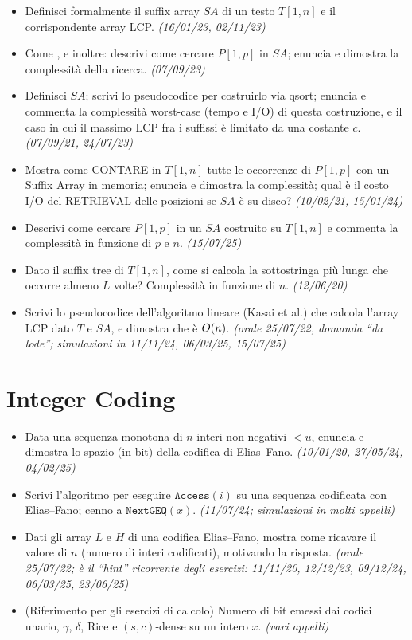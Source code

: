 \begin{itemize}[leftmargin=1.4em]
\item {} Definisci formalmente il suffix array $SA$ di un testo $T[1,n]$ e il corrispondente
array LCP. \emph{(16/01/23, 02/11/23)}
\item {}\hot Come , e inoltre: descrivi come cercare $P[1,p]$ in $SA$; enuncia e dimostra
la complessit\`a della ricerca. \emph{(07/09/23)}
\item {} Definisci $SA$; scrivi lo pseudocodice per costruirlo via qsort; enuncia e commenta
la complessit\`a worst-case (tempo e I/O) di questa costruzione, e il caso in cui il massimo LCP fra
i suffissi \`e limitato da una costante $c$. \emph{(07/09/21, 24/07/23)}
\item {}\hot Mostra come CONTARE in $T[1,n]$ tutte le occorrenze di $P[1,p]$ con un Suffix Array
in memoria; enuncia e dimostra la complessit\`a; qual \`e il costo I/O del RETRIEVAL delle posizioni
se $SA$ \`e su disco? \emph{(10/02/21, 15/01/24)}
\item {}\hot Descrivi come cercare $P[1,p]$ in un $SA$ costruito su $T[1,n]$ e commenta la
complessit\`a in funzione di $p$ e $n$. \emph{(15/07/25)}
\item {} Dato il suffix tree di $T[1,n]$, come si calcola la sottostringa pi\`u lunga che
occorre almeno $L$ volte? Complessit\`a in funzione di $n$. \emph{(12/06/20)}
\item {} Scrivi lo pseudocodice dell'algoritmo lineare (Kasai et al.) che calcola l'array LCP
dato $T$ e $SA$, e dimostra che \`e $O\!\left(n\right)$. \emph{(orale 25/07/22, domanda ``da lode''; simulazioni
in 11/11/24, 06/03/25, 15/07/25)}
\end{itemize}

\section{Integer Coding}

\begin{itemize}[leftmargin=1.4em]
\item {}\hot Data una sequenza monotona di $n$ interi non negativi $<u$, enuncia e dimostra lo
spazio (in bit) della codifica di Elias--Fano. \emph{(10/01/20, 27/05/24, 04/02/25)}
\item {} Scrivi l'algoritmo per eseguire $\texttt{Access}(i)$ su una sequenza codificata con
Elias--Fano; cenno a $\texttt{NextGEQ}(x)$. \emph{(11/07/24; simulazioni in molti appelli)}
\item {} Dati gli array $L$ e $H$ di una codifica Elias--Fano, mostra come ricavare il valore
di $n$ (numero di interi codificati), motivando la risposta. \emph{(orale 25/07/22; \`e il ``hint''
ricorrente degli esercizi: 11/11/20, 12/12/23, 09/12/24, 06/03/25, 23/06/25)}
\item {} (Riferimento per gli esercizi di calcolo) Numero di bit emessi dai codici unario,
$\gamma$, $\delta$, Rice e $(s,c)$-dense su un intero $x$. \emph{(vari appelli)}
\end{itemize}

